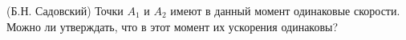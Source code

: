 (Б.Н. Садовский)
Точки $A_{1}$ и $A_{2}$ имеют в данный момент одинаковые скорости.
Можно ли утверждать, что в этот момент их ускорения одинаковы?
